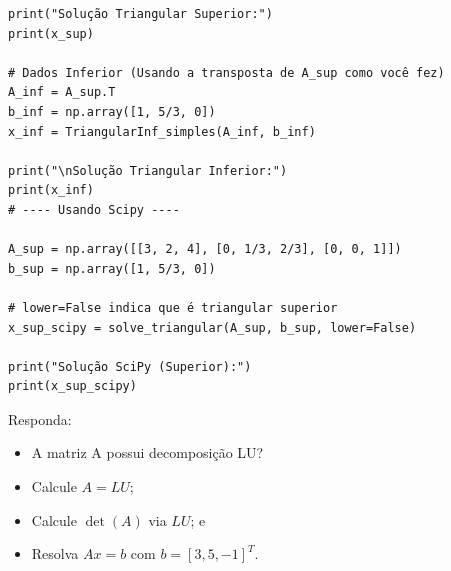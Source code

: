 \documentclass[../numerical_methods.tex]{subfiles}
\begin{document}
\begin{exr}
\begin{listing}[H]
\begin{verbatim}
print("Solução Triangular Superior:")
print(x_sup)

# Dados Inferior (Usando a transposta de A_sup como você fez)
A_inf = A_sup.T
b_inf = np.array([1, 5/3, 0])
x_inf = TriangularInf_simples(A_inf, b_inf)

print("\nSolução Triangular Inferior:")
print(x_inf)
# ---- Usando Scipy ----

A_sup = np.array([[3, 2, 4], [0, 1/3, 2/3], [0, 0, 1]])
b_sup = np.array([1, 5/3, 0])

# lower=False indica que é triangular superior
x_sup_scipy = solve_triangular(A_sup, b_sup, lower=False)

print("Solução SciPy (Superior):")
print(x_sup_scipy)
 \end{verbatim}
	\end{listing}
	Responda:
	\begin{itemize}
		\item[1)] A matriz A possui decomposição LU?
		\item[2)] Calcule \(A = LU\);
		\item[3)] Calcule \(\det{(A)}\) via \(LU\); e
		\item[4)] Resolva \(Ax = b\) com \(b = [3, 5, -1]^{T}\).
	\end{itemize}
\end{exr}
\end{document}
